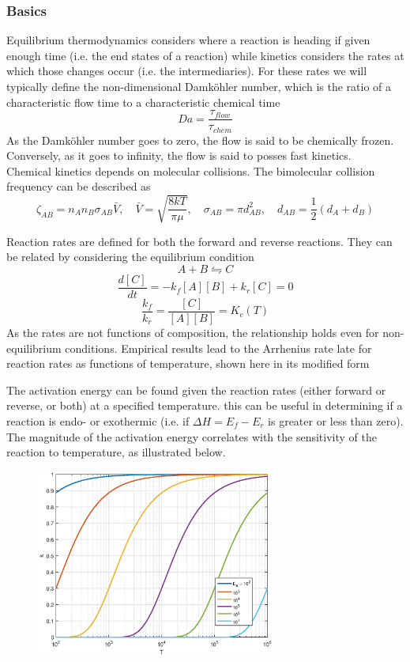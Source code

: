 \documentclass[11pt]{article}
\newcommand{\CenteredBoxed}[1]{\begin{center}\boxed{#1}\end{center}}
\begin{document}
\subsubsection{Basics}
Equilibrium thermodynamics considers where a reaction is heading if given enough time (i.e. the end states of a reaction) while kinetics considers the rates at which those changes occur (i.e. the intermediaries). For these rates we will typically define the non-dimensional Damk{\"o}hler number, which is the ratio of a characteristic flow time to a characteristic chemical time
$$Da = \frac{\tau_{flow}}{\tau_{chem}}$$
As the Damk{\"o}hler number goes to zero, the flow is said to be chemically frozen. Conversely, as it goes to infinity, the flow is said to posses fast kinetics.\\

Chemical kinetics depends on molecular collisions. The bimolecular collision frequency can be described as
$$\zeta_{AB} = n_An_B\sigma_{AB}\bar{V},\quad \bar{V}=\sqrt{\frac{8kT}{\pi\mu}}, \quad \sigma_{AB} = \pi d_{AB}^2,\quad d_{AB} = \frac{1}{2}(d_A+d_B)$$

Reaction rates are defined for both the forward and reverse reactions. They can be related by considering the equilibrium condition
$$A + B \leftrightharpoons C$$
$$\frac{d[C]}{dt} = -k_f[A][B] + k_r[C]= 0$$
$$\frac{k_f}{k_r} = \frac{[C]}{[A][B]} = K_c(T)$$
As the rates are not functions of composition, the relationship holds even for non-equilibrium conditions. Empirical results lead to the Arrhenius rate late for reaction rates as functions of temperature, shown here in its modified form
\CenteredBoxed{k = AT^b\exp\left(\frac{-E_A}{RT}\right)}
The activation energy can be found given the reaction rates (either forward or reverse, or both) at a specified temperature. this can be useful in determining if a reaction is endo- or exothermic (i.e. if $\Delta H = E_f-E_r$ is greater or less than zero). The magnitude of the activation energy correlates with the sensitivity of the reaction to temperature, as illustrated below.
\begin{figure}[h]
\centering
\includegraphics[width=0.7\textwidth]{Graphics/k_vs_T.eps}
\end{figure}
\end{document}

